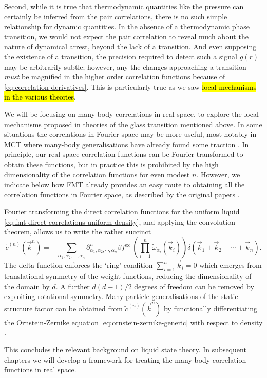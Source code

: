 Second, while it is true that thermodynamic quantities like the pressure can certainly be inferred from the pair correlations, there is no such simple relationship for dynamic quantities.
In the absence of a thermodynamic phase transition, we would not expect the pair correlation to reveal much about the nature of dynamical arrest, beyond the lack of a transition.
And even supposing the existence of a transition, the precision required to detect such a signal $g(r)$ may be arbitrarily subtle; however, any the changes approaching a transition \emph{must} be magnified in the higher order correlation functions because of \eqref{eq:correlation-derivatives}.
This is particularly true as we saw \hl{local mechanisms in the various theories}.

We will be focusing on many-body correlations in real space, to explore the local mechanisms proposed in theories of the glass transition mentioned above.
In some situations the correlations in Fourier space may be more useful, most notably in MCT where many-body generalisations have already found some traction \cite{JanssenPRL2015,JanssenFP2018}.
In principle, our real space correlation functions can be Fourier transformed to obtain these functions, but in practice this is prohibited by the high dimensionality of the correlation functions for even modest $n$.
However, we indicate below how FMT already provides an easy route to obtaining all the correlation functions in Fourier space, as described by the original papers \cite{RosenfeldPRL1989,RosenfeldJCP1990}.

Fourier transforming the direct correlation functions for the uniform liquid \eqref{eq:fmt-direct-correlations-uniform-density}, and applying the convolution theorem, allows us to write the rather succinct
\begin{equation}
  \tilde{c}^{(n)}(\vec{k}^n)
  =
  - \sum_{\alpha_1, \alpha_2, \cdots, \alpha_n}
  \partial^n_{\alpha_1, \alpha_2, \cdots, \alpha_n} \beta f^\mathrm{ex} \;
  \left( \prod_{i=1}^n \widetilde{\omega}_{\alpha_i}(\vec{k}_i) \right)
  \delta(\vec{k}_1 + \vec{k}_2 + \cdots + \vec{k}_n).
\end{equation}
The delta function enforces the `ring' condition $\sum_{i=1}^n \vec{k}_i = 0$ which emerges from translational symmetry of the weight functions, reducing the dimensionality of the domain by $d$.
A further $d(d-1)/2$ degrees of freedom%
can be removed by exploiting rotational symmetry.
Many-particle generalisations of the static structure factor can be obtained from $\tilde{c}^{(n)}(\vec{k}^n)$ by functionally differentiating the Ornstein-Zernike equation \eqref{eq:ornstein-zernike-generic} with respect to density \cite{BarratMP1988}.

This concludes the relevant background on liquid state theory.
In subsequent chapters we will develop a framework for treating the many-body correlation functions in real space.
